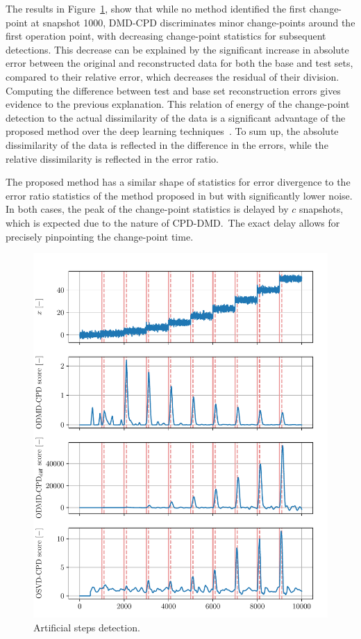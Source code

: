 The results in Figure~\ref{fig:artificial_steps_detection}, show that while no method identified the first change-point at snapshot 1000, DMD-CPD discriminates minor change-points around the first operation point, with decreasing change-point statistics for subsequent detections. This decrease can be explained by the significant increase in absolute error between the original and reconstructed data for both the base and test sets, compared to their relative error, which decreases the residual of their division. Computing the difference between test and base set reconstruction errors gives evidence to the previous explanation. This relation of energy of the change-point detection to the actual dissimilarity of the data is a significant advantage of the proposed method over the deep learning techniques~\citep{DeRyck2021}. To sum up, the absolute dissimilarity of the data is reflected in the difference in the errors, while the relative dissimilarity is reflected in the error ratio.

The proposed method has a similar shape of statistics for error divergence to the error ratio statistics of the method proposed in \citet{Kawahara2007} but with significantly lower noise. In both cases, the peak of the change-point statistics is delayed by \(c\) snapshots, which is expected due to the nature of CPD-DMD.~The exact delay allows for precisely pinpointing the change-point time.

\begin{figure}[H]
	\centering
	\includegraphics[width=\linewidth]{figures/y0-chd_r2_100_100-roll_301-dmd_w1.0-h80.pdf}
	\caption{Artificial steps detection.}\label{fig:artificial_steps_detection}
\end{figure}

